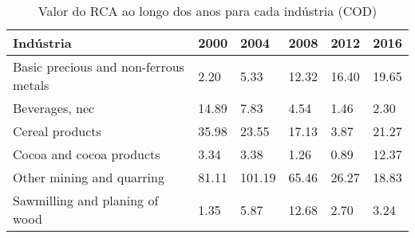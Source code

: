 \begin{table}
\centering
\caption{Valor do RCA ao longo dos anos para cada indústria (COD)}
\begin{tabular}{p{6cm}p{1.5cm}p{1.5cm}p{1.5cm}p{1.5cm}p{1.5cm}}
\toprule
                            Indústria &  2000 &   2004 &  2008 &  2012 &  2016 \\
\midrule
Basic precious and non-ferrous metals &  2.20 &   5.33 & 12.32 & 16.40 & 19.65 \\
                       Beverages, nec & 14.89 &   7.83 &  4.54 &  1.46 &  2.30 \\
                      Cereal products & 35.98 &  23.55 & 17.13 &  3.87 & 21.27 \\
             Cocoa and cocoa products &  3.34 &   3.38 &  1.26 &  0.89 & 12.37 \\
            Other mining and quarring & 81.11 & 101.19 & 65.46 & 26.27 & 18.83 \\
       Sawmilling and planing of wood &  1.35 &   5.87 & 12.68 &  2.70 &  3.24 \\
\bottomrule
\end{tabular}
\end{table}
